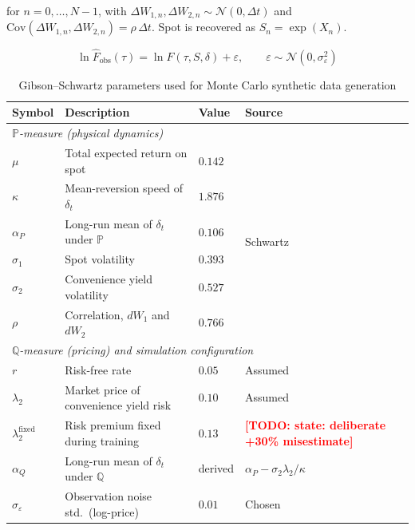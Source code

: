 \documentclass[11pt, a4paper]{article}
\newcommand{\todo}[1]{\textcolor{red}{\textbf{[TODO: #1]}}}
\begin{document}
for $n = 0,\dots,N-1$, with $\Delta W_{1,n},\Delta W_{2,n}\sim\mathcal{N}(0,\Delta t)$ and $\mathrm{Cov}(\Delta W_{1,n},\Delta W_{2,n})=\rho\,\Delta t$. Spot is recovered as $S_n = \exp(X_n)$.

\begin{equation}
\ln \hat{F}_{\text{obs}}(\tau) = \ln F(\tau, S, \delta) + \varepsilon, \qquad \varepsilon \sim \mathcal{N}(0,\sigma_\varepsilon^2)
\label{eq:noise-model}
\end{equation}

\begin{table}[htbp]
\centering
\caption{Gibson–Schwartz parameters used for Monte Carlo synthetic data generation}
\label{tab:gs-mc-params}
\begin{threeparttable}
\begin{tabular}{llll}
\toprule
Symbol & Description & Value & Source \\
\midrule
\multicolumn{4}{l}{\textit{$\mathbb{P}$-measure (physical dynamics)}} \\
\midrule
$\mu$        & Total expected return on spot        & $0.142$ & \multirow{6}{*}{Schwartz~\cite{Schwartz1997TheHedging}\tnote{a}} \\
$\kappa$     & Mean-reversion speed of $\delta_t$    & $1.876$ & \\
$\alpha_P$   & Long-run mean of $\delta_t$ under $\mathbb{P}$ & $0.106$ & \\
$\sigma_1$   & Spot volatility                       & $0.393$ & \\
$\sigma_2$   & Convenience yield volatility          & $0.527$ & \\
$\rho$       & Correlation, $dW_1$ and $dW_2$        & $0.766$ & \\
\midrule
\multicolumn{4}{l}{\textit{$\mathbb{Q}$-measure (pricing) and simulation configuration}} \\
\midrule
$r$          & Risk-free rate                        & $0.05$   & Assumed \\
$\lambda_2$  & Market price of convenience yield risk & $0.10$   & Assumed\tnote{b} \\
$\lambda_2^{\text{fixed}}$ & Risk premium fixed during training & $0.13$ & \todo{state: deliberate +30\% misestimate} \\
$\alpha_Q$   & Long-run mean of $\delta_t$ under $\mathbb{Q}$ & derived & $\alpha_P - \sigma_2\lambda_2/\kappa$ \\
$\sigma_\varepsilon$ & Observation noise std.\ (log-price) & $0.01$ & Chosen \\

\end{tabular}
\end{threeparttable}
\end{table}
\end{document}
